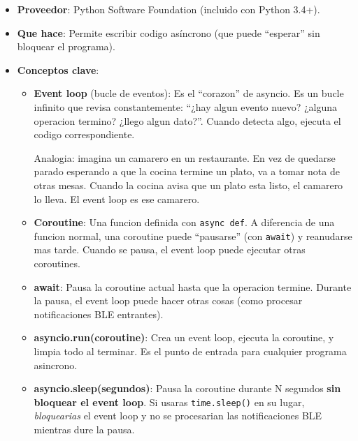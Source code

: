 \documentclass[11pt,a4paper]{article}
\begin{document}
\begin{itemize}
    \item \textbf{Proveedor}: Python Software Foundation (incluido
          con Python 3.4+).
    \item \textbf{Que hace}: Permite escribir codigo asíncrono
          (que puede ``esperar'' sin bloquear el programa).
    \item \textbf{Conceptos clave}:

    \begin{itemize}
        \item \textbf{Event loop} (bucle de eventos): Es el
              ``corazon'' de asyncio. Es un bucle infinito que
              revisa constantemente: ``¿hay algun evento nuevo?
              ¿alguna operacion termino? ¿llego algun dato?''. Cuando
              detecta algo, ejecuta el codigo correspondiente.

              Analogia: imagina un camarero en un restaurante. En
              vez de quedarse parado esperando a que la cocina
              termine un plato, va a tomar nota de otras mesas.
              Cuando la cocina avisa que un plato esta listo, el
              camarero lo lleva. El event loop es ese camarero.

        \item \textbf{Coroutine}: Una funcion definida con
              \texttt{async def}. A diferencia de una funcion
              normal, una coroutine puede ``pausarse'' (con
              \texttt{await}) y reanudarse mas tarde. Cuando se
              pausa, el event loop puede ejecutar otras coroutines.

        \item \textbf{await}: Pausa la coroutine actual hasta que
              la operacion termine. Durante la pausa, el event loop
              puede hacer otras cosas (como procesar notificaciones
              BLE entrantes).

        \item \textbf{asyncio.run(coroutine)}: Crea un event loop,
              ejecuta la coroutine, y limpia todo al terminar. Es
              el punto de entrada para cualquier programa asincrono.

        \item \textbf{asyncio.sleep(segundos)}: Pausa la coroutine
              durante N segundos \textbf{sin bloquear el event loop}.
              Si usaras \texttt{time.sleep()} en su lugar,
              \emph{bloquearias} el event loop y no se procesarian
              las notificaciones BLE mientras dure la pausa.
    \end{itemize}
\end{itemize}
\end{document}
